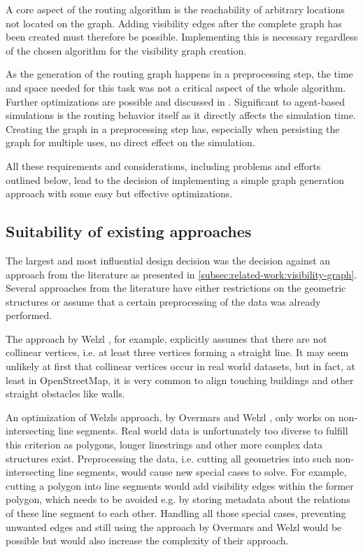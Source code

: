 		A core aspect of the routing algorithm is the reachability of arbitrary locations not located on the graph.
		Adding visibility edges after the complete graph has been created must therefore be possible.
		Implementing this is necessary regardless of the chosen algorithm for the visibility graph creation.
		
		As the generation of the routing graph happens in a preprocessing step, the time and space needed for this task was not a critical aspect of the whole algorithm.
		Further optimizations are possible and discussed in .
		Significant to agent-based simulations is the routing behavior itself as it directly affects the simulation time.
		Creating the graph in a preprocessing step has, especially when persisting the graph for multiple uses, no direct effect on the simulation.
		
		All these requirements and considerations, including problems and efforts outlined below, lead to the decision of implementing a simple graph generation approach with some easy but effective optimizations.
	
	\subsection{Suitability of existing approaches}

		The largest and most influential design decision was the decision against an approach from the literature as presented in \cref{subsec:related-work:visibility-graph}.
		Several approaches from the literature have either restrictions on the geometric structures or assume that a certain preprocessing of the data was already performed.
		
		The approach by Welzl \cite{welzl-visibility-graph}, for example, explicitly assumes that there are not collinear vertices, i.e. at least three vertices forming a straight line.
		It may seem unlikely at first that collinear vertices occur in real world datasets, but in fact, at least in OpenStreetMap, it is very common to align touching buildings and other straight obstacles like walls.
		
		An optimization of Welzls approach, by Overmars and Welzl \cite{overmars-weizl-visibility-graph}, only works on non-intersecting line segments.
		Real world data is unfortunately too diverse to fulfill this criterion as polygons, longer linestrings and other more complex data structures exist.
		Preprocessing the data, i.e. cutting all geometries into such non-intersecting line segments, would cause new special cases to solve.
		For example, cutting a polygon into line segments would add visibility edges within the former polygon, which needs to be avoided e.g. by storing metadata about the relations of these line segment to each other.
		Handling all those special cases, preventing unwanted edges and still using the approach by Overmars and Welzl would be possible but would also increase the complexity of their approach.
		
